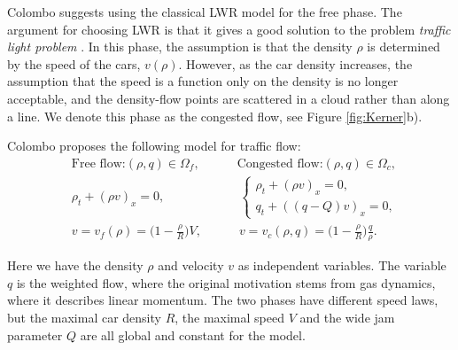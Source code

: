\documentclass[10pt]{article}
\numberwithin{equation}{section}
\begin{document}
Colombo suggests using the classical LWR model for the free phase. The argument for choosing LWR is that it gives a good solution to the problem \textit{traffic light problem} \cite[p.~71]{TrafficLight}. In this phase, the assumption is that the density $\rho$ is determined by the speed of the cars, $v(\rho)$. However, as the car density increases, the assumption that the speed is a function only on the density is no longer acceptable, and the density-flow points are scattered in a cloud rather than along a line. We denote this phase as the congested flow, see Figure \ref{fig:Kerner}b). 

Colombo proposes the following model for traffic flow: 
\begin{align}
    & \text{Free flow:}  (\rho, q) \in \Omega_f, \quad \quad \quad \text{Congested flow:} (\rho, q) \in \Omega_c, \nonumber \\
    & \rho_t + (\rho v )_x = 0, \quad \quad   \quad \quad \quad \quad 
    \begin{cases}
    \rho_t + (\rho v )_x = 0 , \\
    q_t + ((q-Q)v)_x = 0 ,
    \end{cases} \label{Eq:phase-transition} \\
    & v = v_f(\rho) = \big(1- \frac{\rho}{R}\big)V, \quad \quad \quad v = v_c(\rho,q) = \big(1 - \frac{\rho}{R}\big)\frac{q}{\rho}. \nonumber
\end{align}

Here we have the density $\rho$ and velocity $v$ as independent variables. The variable $q$ is the weighted flow, where the original motivation stems from gas dynamics, where it describes linear momentum. The two phases have different speed laws, but the maximal car density $R$, the maximal speed $V$ and the wide jam parameter $Q$ are all global and constant for the model. 
\end{document}
